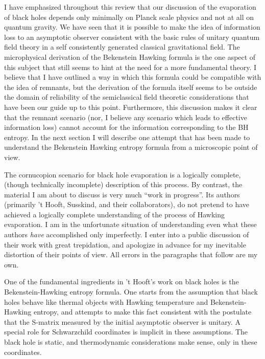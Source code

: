 I have emphasized throughout this
review that our discussion of the evaporation of black holes
 depends only minimally on Planck scale physics and
not at all on quantum gravity.  We have seen that it is possible
to make the idea of information loss to an asymptotic observer
consistent with the basic rules of unitary quantum field theory in
a self consistently generated classical gravitational field.
The microphysical derivation of the
Bekenstein Hawking formula is the one aspect of this subject that still
seems to hint at the need for a more fundamental theory.  I believe that
I have outlined a way in which this formula could be compatible with the
idea of remnants, but the derivation of the formula itself seems to be
outside the domain of reliability of the semiclassical field theoretic
considerations that have been our guide up to this point.
Furthermore, this discussion makes it clear that the remnant scenario
(nor, I believe any scenario which leads to effective information loss)
cannot account for the information corresponding to the BH entropy.
In the next section I will describe one attempt that has been made to
understand the Bekenstein Hawking entropy formula from a microscopic
point of view.


The cornucopion scenario for black hole evaporation is a logically
complete, (though technically incomplete) description of this process.
By contrast, the material I am about to discuss is very much ``work in
progress''.  Its authors (primarily 't Hooft, Susskind, and their
collaborators), do not pretend to have achieved a logically complete
understanding of the process of Hawking
evaporation.  I am in the unfortunate situation of
understanding even what these authors {\it have} accomplished only
imperfectly.  I enter into a public discussion of their work with great
trepidation, and apologize in advance for my inevitable distortion of
their points of view.  All errors in the paragraphs that follow are my
own.

One of the fundamental ingredients in 't Hooft's work on black holes is the
Bekenstein-Hawking entropy formula.  One starts from the
assumption that black holes behave like thermal objects with Hawking
temperature and Bekenstein-Hawking entropy, and attempts to make this
fact consistent with the postulate that the S-matrix measured by the
initial asymptotic observer is unitary.  A special role for Schwarzchild
coordinates is implicit in these assumptions.  The black hole is static,
and thermodynamic considerations make sense, only in these coordinates.


